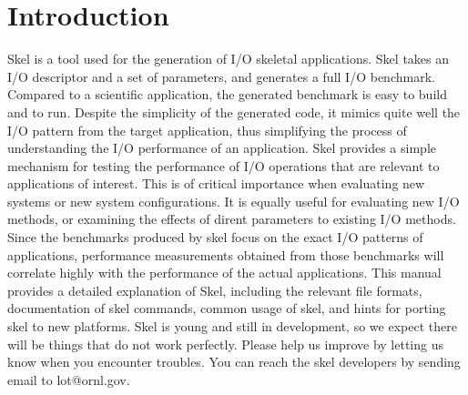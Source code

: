 \chapter{Introduction}

Skel is a tool used for the generation of I/O skeletal applications. Skel takes an
I/O descriptor and a set of parameters, and generates a full I/O benchmark.
Compared to a scientific application, the generated benchmark is easy to build
and to run. Despite the simplicity of the generated code, it mimics quite well
the I/O pattern from the target application, thus simplifying the process of
understanding the I/O performance of an application.
Skel provides a simple mechanism for testing the performance of I/O operations
that are relevant to applications of interest. This is of critical importance
when evaluating new systems or new system configurations. It is equally useful
for evaluating new I/O methods, or examining the effects of dirent parameters
to existing I/O methods. Since the benchmarks produced by skel focus
on the exact I/O patterns of applications, performance measurements obtained
from those benchmarks will correlate highly with the performance of the actual
applications.
This manual provides a detailed explanation of Skel, including the relevant
file formats, documentation of skel commands, common usage of skel, and hints
for porting skel to new platforms. Skel is young and still in development, so we
expect there will be things that do not work perfectly. Please help us improve by
letting us know when you encounter troubles. You can reach the skel developers
by sending email to lot@ornl.gov.

